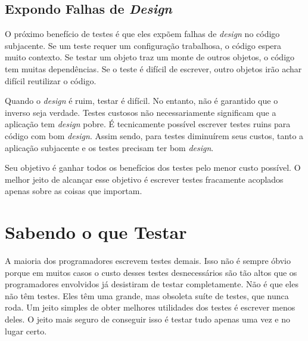\subsection{Expondo Falhas de \textit{Design}}

O próximo benefício de testes é que eles expõem falhas de \textit{design} no código subjacente. Se um teste requer um configuração trabalhosa, o código espera muito contexto. Se testar um objeto traz um monte de outros objetos, o código tem muitas dependências. Se o teste é difícil de escrever, outro objetos irão achar difícil reutilizar o código. 

Quando o \textit{design} é ruim, testar é difícil. No entanto, não é garantido que o inverso seja verdade. Testes custosos não necessariamente significam que a aplicação tem \textit{design} pobre. É tecnicamente possível escrever testes ruins para código com bom \textit{design}. Assim sendo, para testes diminuírem seus custos, tanto a aplicação subjacente e os testes precisam ter bom \textit{design}.

Seu objetivo é ganhar todos os benefícios dos testes pelo menor custo possível. O melhor jeito de alcançar esse objetivo é escrever testes fracamente acoplados apenas sobre as coisas que importam.

\section{Sabendo o que Testar}

A maioria dos programadores escrevem testes demais. Isso não é sempre óbvio porque em muitos casos o custo desses testes desnecessários são tão altos que os programadores envolvidos já desistiram de testar completamente. Não é que eles não têm testes. Eles têm uma grande, mas obsoleta suíte de testes, que nunca roda. Um jeito simples de obter melhores utilidades dos testes é escrever menos deles. O jeito mais seguro de conseguir isso é testar tudo apenas uma vez e no lugar certo. 


